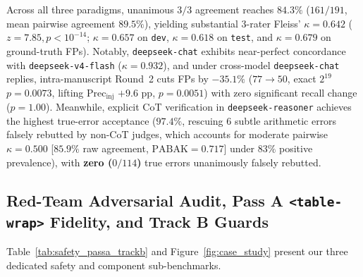 \documentclass[11pt,a4paper]{article}
\begin{document}
Across all three paradigms, unanimous $3/3$ agreement reaches $\mathbf{84.3\%}$ ($161/191$, mean pairwise agreement $89.5\%$), yielding substantial 3-rater Fleiss' $\kappa = \mathbf{0.642}$ ($z=7.85, p < 10^{-14}$; $\kappa = 0.657$ on \texttt{dev}, $\kappa = 0.618$ on \texttt{test}, and $\kappa = 0.679$ on ground-truth FPs). Notably, \texttt{deepseek-chat} exhibits near-perfect concordance with \texttt{deepseek-v4-flash} ($\kappa = 0.932$), and under cross-model \texttt{deepseek-chat} replies, intra-manuscript Round~2 cuts FPs by $\mathbf{-35.1\%}$ ($77 \to 50$, exact $2^{19}$ $p=0.0073$, lifting $\text{Prec}_{\text{inj}}$ $+9.6\text{ pp}$, $p=0.0051$) with zero significant recall change ($p=1.00$). Meanwhile, explicit CoT verification in \texttt{deepseek-reasoner} achieves the highest true-error acceptance ($\mathbf{97.4\%}$, rescuing $6$ subtle arithmetic errors falsely rebutted by non-CoT judges, which accounts for moderate pairwise $\kappa = 0.500$ [$85.9\%$ raw agreement, $\text{PABAK}=0.717$] under $83\%$ positive prevalence), with \textbf{zero ($0/114$)} true errors unanimously falsely rebutted.

\subsection{Red-Team Adversarial Audit, Pass A \texorpdfstring{\texttt{<table-wrap>}}{<table-wrap>} Fidelity, and Track B Guards}
\label{sec:safety_results}
Table~\ref{tab:safety_passa_trackb} and Figure~\ref{fig:case_study} present our three dedicated safety and component sub-benchmarks.
\end{document}
